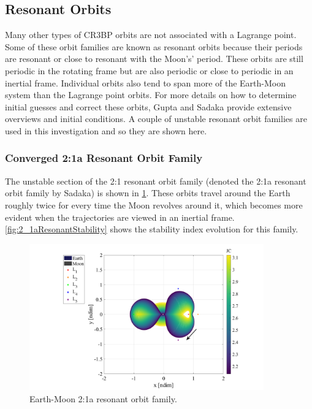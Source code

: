 \subsection{Resonant Orbits}
Many other types of CR3BP orbits are not associated with a Lagrange point. Some of these orbit
families are known as resonant orbits because their periods are resonant or close to resonant with
the Moon's' period. These orbits are still periodic in the rotating frame but are also periodic or
close to periodic in an inertial frame. Individual orbits also tend to span more of the Earth-Moon
system than the Lagrange point orbits. For more details on how to determine initial guesses and
correct these orbits, Gupta\cite{Gupta:2020} and Sadaka\cite{Sadaka:2023} provide extensive
overviews and initial conditions. A couple of unstable resonant orbit families are used in this
investigation and so they are shown here.

\subsubsection{Converged 2:1a Resonant Orbit Family}
The unstable section of the 2:1 resonant orbit family (denoted the 2:1a resonant orbit family by
Sadaka) is shown in \cref{fig:2_1aResonant}\cite{Sadaka:2023}. These orbits travel around the
Earth roughly twice for every time the Moon revolves around it, which becomes more evident when
the trajectories are viewed in an inertial frame. \cref{fig:2_1aResonantStability} shows the
stability index evolution for this family.

\begin{figure}[ht]
    \centering
    \includegraphics[width=0.9\textwidth]{figures/Resonant2_1aFamily.pdf}
    \caption{Earth-Moon 2:1a resonant orbit family.}
    \label{fig:2_1aResonant}
\end{figure}

